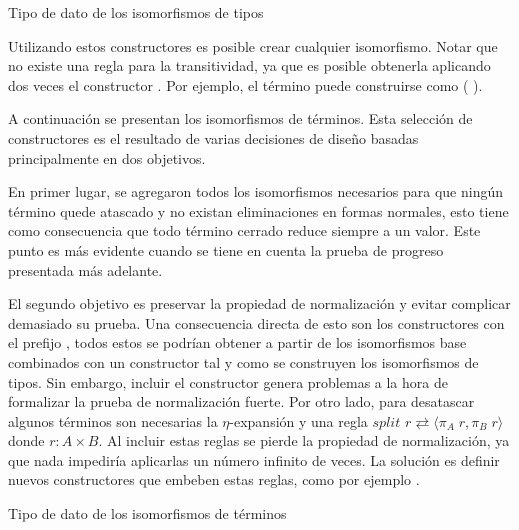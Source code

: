 \documentclass[]{report}
\begin{document}
	\begin{codigo}
		Tipo de dato de los isomorfismos de tipos
		
	\end{codigo}
	
	Utilizando estos constructores es posible crear cualquier isomorfismo.
	Notar que no existe una regla para la transitividad, ya que es posible obtenerla aplicando dos veces el constructor \AgdaInductiveConstructor{$[\_]\equiv\_$}. Por ejemplo, el término \AgdaInductiveConstructor{[ trans}   \AgdaInductiveConstructor{]$\equiv$}  puede construirse como  \AgdaInductiveConstructor{[}  \AgdaInductiveConstructor{]$\equiv$} (\AgdaInductiveConstructor{[}  \AgdaInductiveConstructor{]$\equiv$} ).
	
	A continuación se presentan los isomorfismos de términos.
	Esta selección de constructores es el resultado de varias decisiones de diseño basadas principalmente en dos objetivos.
	
	En primer lugar, se agregaron todos los isomorfismos necesarios para que ningún término quede atascado y no existan eliminaciones en formas normales, esto tiene como consecuencia que todo término cerrado reduce siempre a un valor. Este punto es más evidente cuando se tiene en cuenta la prueba de progreso presentada más adelante.
	
	El segundo objetivo es preservar la propiedad de normalización y evitar complicar demasiado su prueba.
	Una consecuencia directa de esto son los constructores con el prefijo , todos estos se podrían obtener a partir de los isomorfismos base combinados con un constructor  tal y como se construyen los isomorfismos de tipos.
	Sin embargo, incluir el constructor  genera problemas a la hora de formalizar la prueba de normalización fuerte.
	Por otro lado, para desatascar algunos términos son necesarias la $\eta$-expansión y una regla $split$ $r \rightleftarrows \langle \pi_A\; r , \pi_B\; r \rangle$ donde $r: A \times B$.
	Al incluir estas reglas se pierde la propiedad de normalización, ya que nada impediría aplicarlas un número infinito de veces.
	La solución es definir nuevos constructores que embeben estas reglas, como por ejemplo .
	
	
	\begin{codigo}
		Tipo de dato de los isomorfismos de términos
		
	\end{codigo}
	
\end{document}
